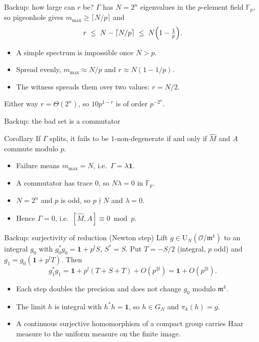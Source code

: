 \documentclass[aspectratio=169,compress]{beamer}
\newcommand{\OK}{\mathcal{O}}
\newcommand{\mm}{\mathfrak{m}}
\newcommand{\FF}{\mathbb{F}}
\newcommand{\Uni}{\mathrm{U}}
\newcommand{\Id}{\mathbf{1}}
\begin{document}
\begin{frame}{Backup: how large can $r$ be?}
  $\Gamma$ has $N=2^{n}$ eigenvalues in the $p$-element field $\FF_p$, so
  pigeonhole gives $m_{\max}\ge\lceil N/p\rceil$ and
  \[
    r\;\le\;N-\lceil N/p\rceil\;\le\;N\Bigl(1-\tfrac1p\Bigr).
  \]
  \begin{itemize}
    \item A simple spectrum is impossible once $N>p$.
    \item Spread evenly, $m_{\max}\approx N/p$ and $r\approx N(1-1/p)$.
    \item The witness spreads them over two values: $r=N/2$.
  \end{itemize}
  Either way $r=\Theta(2^{n})$, so $10p^{1-r}$ is of order $p^{-2^{n}}$.
\end{frame}

\begin{frame}{Backup: the bad set is a commutator}
  \begin{block}{Corollary}
    If $\Gamma$ splits, it fails to be $1$-non-degenerate if and only if
    $\widehat M$ and $A$ commute modulo $p$.
  \end{block}
  \begin{itemize}
    \item Failure means $m_{\max}=N$, i.e.\ $\Gamma=\lambda\Id$.
    \item A commutator has trace $0$, so $N\lambda=0$ in $\FF_p$.
    \item $N=2^{n}$ and $p$ is odd, so $p\nmid N$ and $\lambda=0$.
    \item Hence $\Gamma=0$, i.e.\ $[\widehat M,A]\equiv0\bmod p$.
  \end{itemize}
\end{frame}

\begin{frame}{Backup: surjectivity of reduction (Newton step)}
  Lift $g\in\Uni_N(\OK/\mm^{k})$ to an integral $g_0$ with
  $g_0^{*}g_0=\Id+p^{l}S$, $S^{*}=S$. Put $T=-S/2$ (integral, $p$ odd) and
  $g_1=g_0(\Id+p^{l}T)$. Then
  \[
    g_1^{*}g_1=\Id+p^{l}(T+S+T)+O(p^{2l})=\Id+O(p^{2l}).
  \]
  \begin{itemize}
    \item Each step doubles the precision and does not change $g_0$ modulo
      $\mm^{k}$.
    \item The limit $h$ is integral with $h^{*}h=\Id$, so $h\in G_N$ and
      $\pi_k(h)=g$.
    \item A continuous surjective homomorphism of a compact group carries Haar
      measure to the uniform measure on the finite image.
  \end{itemize}
\end{frame}
\end{document}
